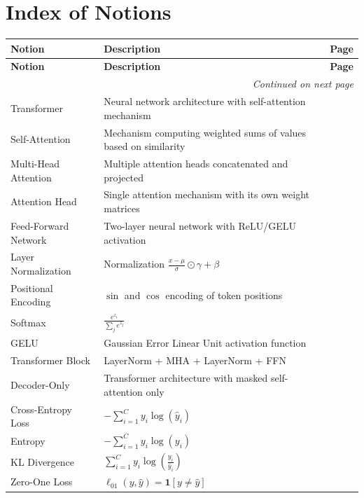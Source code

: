 \documentclass{amsart}
\newenvironment{notiontable}{%
	\renewcommand{\arraystretch}{1.2}%
	\setlength{\tabcolsep}{4pt}%
	\begin{longtable}{|l|p{10cm}|c|}
		\hline
		\textbf{Notion} & \textbf{Description} & \textbf{Page} \\
		\hline
		\endfirsthead
		\hline
		\textbf{Notion} & \textbf{Description} & \textbf{Page} \\
		\hline
		\endhead
		\hline
		\multicolumn{3}{r}{\textit{Continued on next page}} \\
		\endfoot
		\hline
		\endlastfoot
}{%
	\end{longtable}%
}
\theoremstyle{break}
\newcommand{\idx}[1]{\index{#1}}
\begin{document}
	\vspace{20pt}
	\section{Index of Notions}
	\label{sec:index}
	\idx{Index}
	\vspace{20pt}
	
	
	
	\begin{notiontable}
		Transformer & Neural network architecture with self-attention mechanism & \pageref{def:transformer} \\
		Self-Attention & Mechanism computing weighted sums of values based on similarity & \pageref{def:self-attention} \\
		Multi-Head Attention & Multiple attention heads concatenated and projected & \pageref{def:multi-head-attention} \\
		Attention Head & Single attention mechanism with its own weight matrices & \pageref{def:attention-head} \\
		Feed-Forward Network & Two-layer neural network with ReLU/GELU activation & \pageref{def:feed-forward} \\
		Layer Normalization & Normalization $\frac{x - \mu}{\sigma} \odot \gamma + \beta$ & \pageref{def:layer-norm} \\
		Positional Encoding & $\sin$ and $\cos$ encoding of token positions & \pageref{def:positional-encoding} \\
		Softmax & $\frac{e^{z_i}}{\sum_j e^{z_j}}$ & \pageref{def:softmax} \\
		GELU & Gaussian Error Linear Unit activation function & \pageref{def:gelu} \\
		Transformer Block & LayerNorm + MHA + LayerNorm + FFN & \pageref{def:transformer-block} \\
		Decoder-Only & Transformer architecture with masked self-attention only & \pageref{def:decoder-only} \\
		
		Cross-Entropy Loss & $-\sum_{i=1}^C y_i \log(\hat{y}_i)$ & \pageref{def:cross-entropy} \\
		Entropy & $-\sum_{i=1}^C y_i \log(y_i)$ & \pageref{def:entropy} \\
		KL Divergence & $\sum_{i=1}^C y_i \log\left(\frac{y_i}{\hat{y}_i}\right)$ & \pageref{def:kl-divergence} \\
		Zero-One Loss & $\ell_{01}(y, \hat{y}) = \mathbf{1}[y \neq \hat{y}]$ & \pageref{def:zero-one-loss} \\
		

\end{notiontable}
\end{document}
